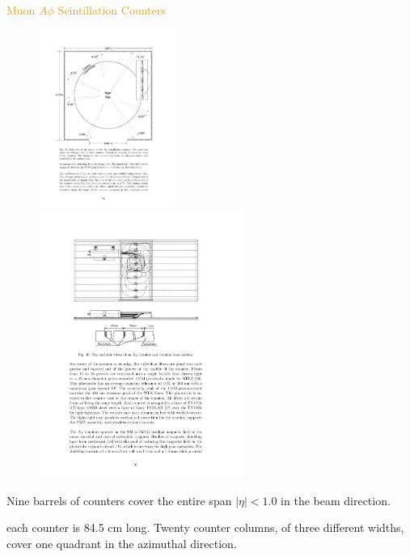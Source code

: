 \begin{frame}{\textcolor{Goldenrod}{Muon $A\phi$ Scintillation Counters}}
  \begin{overlayarea}{\textwidth}{\textheight}
    \begin{figure}[h]
      \centering
      \includegraphics[height=0.4\textheight, width=0.4\textwidth]{./Images/46_MD_Scint_01.pdf}
      \includegraphics[height=0.4\textheight, width=0.6\textwidth]{./Images/46_MD_Scint_02.pdf}
    \end{figure}
    \itt

  \item
    Nine barrels of counters cover the entire span $|\eta| < 1.0$ in the
    beam direction.

    \item each counter is 84.5 cm long. Twenty
      counter columns, of three different widths, cover one quadrant in
      the azimuthal direction.
    

\end{overlayarea}
\end{frame}
